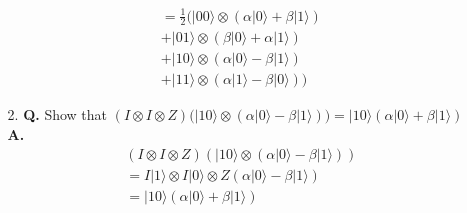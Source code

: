 \documentclass[main.tex]{subfiles}
\begin{document}
\begin{enumerate}
\begin{enumerate}
\begin{align*}
        & = \frac{1}{2}(|00\rangle \otimes(\alpha|0\rangle + \beta|1\rangle)\\
        & +|01\rangle \otimes(\beta|0\rangle+\alpha|1\rangle)\\
        & +|10\rangle \otimes(\alpha|0\rangle-\beta|1\rangle)\\ 
        & +|11\rangle \otimes(\alpha|1\rangle-\beta|0\rangle))
    \end{align*}
    \item [2.] \textbf{Q.} Show that $(I \otimes I \otimes Z)(|10\rangle \otimes(\alpha|0\rangle-\beta|1\rangle))=|10\rangle(\alpha|0\rangle+\beta|1\rangle)$ \textbf{A.}
    \begin{align*}
        & (I \otimes I \otimes Z)(|10\rangle \otimes(\alpha|0\rangle-\beta|1\rangle))\\
        & = I |1\rangle \otimes I |0\rangle \otimes Z(\alpha|0\rangle-\beta|1\rangle) \\
        & = |10\rangle(\alpha|0\rangle+\beta|1\rangle)
    \end{align*}
\end{enumerate}

\end{enumerate}
\end{document}
